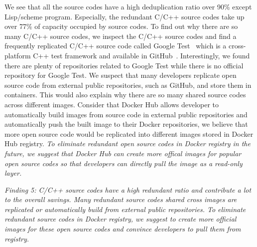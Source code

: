 We see that all the source codes have a high deduplication ratio over 90\% except 
Lisp/scheme program. Especially, the redundant C/C++ source codes take up over 77\% of capacity occupied by source codes. To find out why there are so many C/C++ source codes, we inspect the C/C++ source codes and find a frequently replicated C/C++ source code called Google Test~\cite{xxx} which is a cross-platform C++ test framework and available in GitHub~\cite{xxx}. Interestingly, we found there are plenty of repositories related to Google Test while there is no official repository for Google Test. We suspect that many developers replicate open source code from external public repositories, such as GitHub, and store them in containers. This would also explain why there are so many shared source codes across different images.
Consider that Docker Hub allows developer to automatically build images from source code in external public repositories and automatically push the built image to their Docker repositories, we believe that more open source code would be replicated into different images stored in Docker Hub registry. \textit{To eliminate redundant open source codes in Docker registry in the future, we suggest that Docker Hub can create more offical images for popular open source codes so that developers can directly pull the image as a read-only layer. }

\textit{Finding 5: C/C++ source codes have a high redundant ratio and contribute a lot to the overall savings. Many redundant source codes shared cross images are replicated or automatically build from external public repositories. To eliminate redundant source codes in Docker registry, we suggest to create more official images for these open source codes and convince developers to pull them from registry.}



